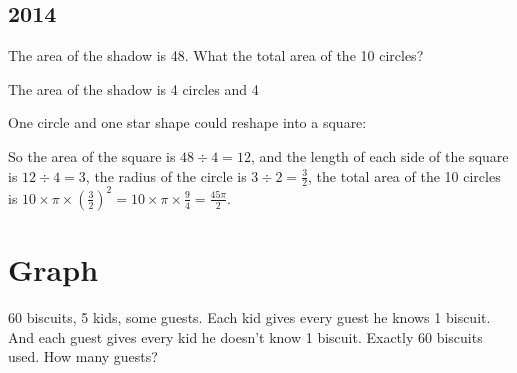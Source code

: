 \section{2014}
\label{sec:pengcheng2014}

\begin{example}
  The area of the shadow is 48. What the total area of the 10 circles?
  \begin{center}
  \end{center}
\end{example}

The area of the shadow is 4 circles  and 4 

One circle and one star shape could reshape into a square:
\begin{center}
\end{center}

So the area of the square is $48\div4=12$, and the length of each side of the square is $12\div 4=3$, the radius of the circle is $3\div2=\frac32$, the total area of the 10 circles is $10\times \pi\times\left(\frac32\right)^2=10\times\pi\times\frac94=\frac{45\pi}{2}$.


\chapter{Graph}
\label{ch:graph}

\begin{example}
  60 biscuits, 5 kids, some guests. Each kid gives every guest he knows 1 biscuit. And each guest gives every kid he doesn't know 1 biscuit. Exactly 60 biscuits used. How many guests?  
\end{example}

